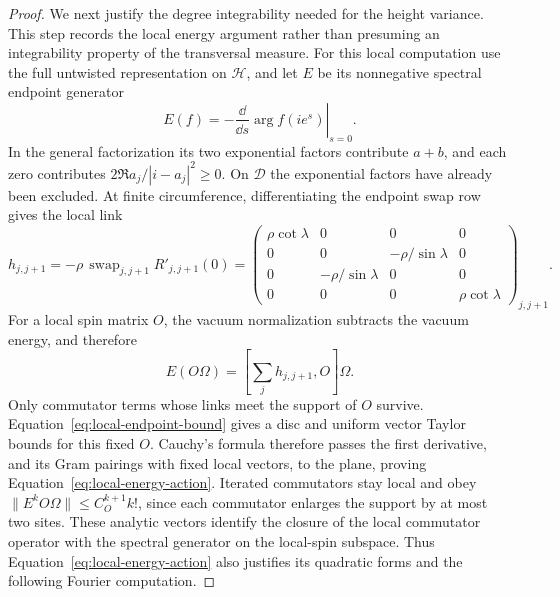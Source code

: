 \begin{proof}
We next justify the degree integrability needed for the height
variance.  This step records the local energy argument rather than
presuming an integrability property of the transversal measure.
For this local computation use the full untwisted representation
on $\mathcal H$, and let $E$ be its nonnegative spectral endpoint
generator
\[
 E(f)=-\left.\frac{\dd}{\dd s}\arg f(ie^s)\right|_{s=0}.
\]
In the general factorization its two exponential factors contribute
$a+b$, and each zero contributes $2\Re a_j/|i-a_j|^2\ge0$.
On $\mathcal D$ the exponential factors have already been excluded.
At finite
circumference, differentiating the endpoint swap row gives the local
link
\[
 h_{j,j+1}=-\rho\,\operatorname{swap}_{j,j+1}R'_{j,j+1}(0)
 =\begin{pmatrix}
 \rho\cot\lambda&0&0&0\\
 0&0&-\rho/\sin\lambda&0\\
 0&-\rho/\sin\lambda&0&0\\
 0&0&0&\rho\cot\lambda
 \end{pmatrix}_{j,j+1}.
\]
For a local spin matrix $O$, the vacuum normalization subtracts the
vacuum energy, and therefore
\begin{equation}\label{eq:local-energy-action}
 E(O\Omega)=\left[\sum_j h_{j,j+1},O\right]\Omega.
\end{equation}
Only commutator terms whose links meet the support of $O$ survive.
Equation~\eqref{eq:local-endpoint-bound} gives a disc and uniform
vector Taylor bounds for this fixed $O$.  Cauchy's formula
therefore passes the first derivative, and its Gram pairings with
fixed local vectors, to the plane, proving
Equation~\eqref{eq:local-energy-action}.  Iterated commutators stay local
and obey $\|E^kO\Omega\|\le C_O^{k+1}k!$, since each commutator
enlarges the support by at most two sites.  These analytic vectors
identify the closure of the local commutator operator with the
spectral generator on the local-spin subspace.  Thus
Equation~\eqref{eq:local-energy-action} also justifies its quadratic
forms and the following Fourier computation.


\end{proof}
